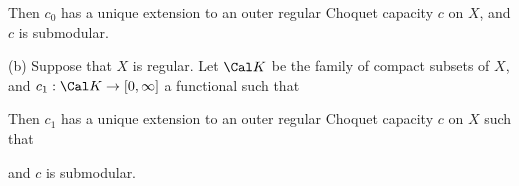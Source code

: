 \noindent Then $c_0$ has a unique extension to an outer regular  
Choquet capacity $c$ on $X$, and $c$ is submodular. 
 
(b) Suppose that $X$ is regular.   Let $\Cal K$ be the family of compact 
subsets of $X$, and $c_1:\Cal K\to[0,\infty]$ a functional such that 
 
 
\noindent Then $c_1$ has a unique extension to an outer regular 
Choquet capacity $c$ on $X$ such that  
 
 
\noindent and $c$ is submodular. 
 
